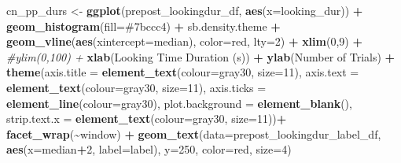 \documentclass[
  doc,floatsintext]{apa6}
\newenvironment{Shaded}{\begin{snugshade}}{\end{snugshade}}
\newcommand{\AttributeTok}[1]{\textcolor[rgb]{0.13,0.29,0.53}{#1}}
\newcommand{\CommentTok}[1]{\textcolor[rgb]{0.56,0.35,0.01}{\textit{#1}}}
\newcommand{\DecValTok}[1]{\textcolor[rgb]{0.00,0.00,0.81}{#1}}
\newcommand{\FunctionTok}[1]{\textcolor[rgb]{0.13,0.29,0.53}{\textbf{#1}}}
\newcommand{\NormalTok}[1]{#1}
\newcommand{\OtherTok}[1]{\textcolor[rgb]{0.56,0.35,0.01}{#1}}
\newcommand{\SpecialCharTok}[1]{\textcolor[rgb]{0.81,0.36,0.00}{\textbf{#1}}}
\newcommand{\StringTok}[1]{\textcolor[rgb]{0.31,0.60,0.02}{#1}}
\begin{document}
\begin{Shaded}
\begin{Highlighting}[]
\NormalTok{cn\_pp\_durs }\OtherTok{\textless{}{-}} \FunctionTok{ggplot}\NormalTok{(prepost\_lookingdur\_df, }\FunctionTok{aes}\NormalTok{(}\AttributeTok{x=}\NormalTok{looking\_dur)) }\SpecialCharTok{+}
  \FunctionTok{geom\_histogram}\NormalTok{(}\AttributeTok{fill=}\StringTok{\textquotesingle{}\#7bccc4\textquotesingle{}}\NormalTok{) }\SpecialCharTok{+}
\NormalTok{  sb.density.theme }\SpecialCharTok{+}
  \FunctionTok{geom\_vline}\NormalTok{(}\FunctionTok{aes}\NormalTok{(}\AttributeTok{xintercept=}\NormalTok{median), }\AttributeTok{color=}\StringTok{\textquotesingle{}red\textquotesingle{}}\NormalTok{, }\AttributeTok{lty=}\DecValTok{2}\NormalTok{) }\SpecialCharTok{+}
  \FunctionTok{xlim}\NormalTok{(}\DecValTok{0}\NormalTok{,}\DecValTok{9}\NormalTok{) }\SpecialCharTok{+}
  \CommentTok{\#ylim(0,100) +}
  \FunctionTok{xlab}\NormalTok{(}\StringTok{\textquotesingle{}Looking Time Duration (s)\textquotesingle{}}\NormalTok{) }\SpecialCharTok{+}
  \FunctionTok{ylab}\NormalTok{(}\StringTok{\textquotesingle{}Number of Trials\textquotesingle{}}\NormalTok{) }\SpecialCharTok{+} 
  \FunctionTok{theme}\NormalTok{(}\AttributeTok{axis.title =} \FunctionTok{element\_text}\NormalTok{(}\AttributeTok{colour=}\StringTok{\textquotesingle{}gray30\textquotesingle{}}\NormalTok{, }\AttributeTok{size=}\DecValTok{11}\NormalTok{),}
        \AttributeTok{axis.text =} \FunctionTok{element\_text}\NormalTok{(}\AttributeTok{colour=}\StringTok{\textquotesingle{}gray30\textquotesingle{}}\NormalTok{, }\AttributeTok{size=}\DecValTok{11}\NormalTok{),}
        \AttributeTok{axis.ticks =} \FunctionTok{element\_line}\NormalTok{(}\AttributeTok{colour=}\StringTok{\textquotesingle{}gray30\textquotesingle{}}\NormalTok{),}
        \AttributeTok{plot.background =} \FunctionTok{element\_blank}\NormalTok{(),}
        \AttributeTok{strip.text.x =} \FunctionTok{element\_text}\NormalTok{(}\AttributeTok{colour=}\StringTok{\textquotesingle{}gray30\textquotesingle{}}\NormalTok{, }\AttributeTok{size=}\DecValTok{11}\NormalTok{))}\SpecialCharTok{+}
  \FunctionTok{facet\_wrap}\NormalTok{(}\SpecialCharTok{\textasciitilde{}}\NormalTok{window) }\SpecialCharTok{+}
  \FunctionTok{geom\_text}\NormalTok{(}\AttributeTok{data=}\NormalTok{prepost\_lookingdur\_label\_df,}
            \FunctionTok{aes}\NormalTok{(}\AttributeTok{x=}\NormalTok{median}\SpecialCharTok{+}\DecValTok{2}\NormalTok{, }\AttributeTok{label=}\NormalTok{label), }\AttributeTok{y=}\DecValTok{250}\NormalTok{, }
            \AttributeTok{color=}\StringTok{\textquotesingle{}red\textquotesingle{}}\NormalTok{, }\AttributeTok{size=}\DecValTok{4}\NormalTok{)}


\end{Highlighting}
\end{Shaded}
\end{document}
